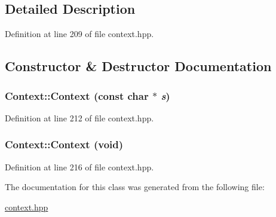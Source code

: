 \subsection{Detailed Description}


Definition at line 209 of file context.hpp.

\subsection{Constructor \& Destructor Documentation}
\hypertarget{class_context_a33e268526c03979a4db8bdabcce2fbf6}{
\subsubsection[{Context}]{\setlength{\rightskip}{0pt plus 5cm}Context::Context (const char $\ast$ {\em s})}}
\label{class_context_a33e268526c03979a4db8bdabcce2fbf6}


Definition at line 212 of file context.hpp.\hypertarget{class_context_a5dd483a8c3183056682ebaa945acdc6d}{
\subsubsection[{Context}]{\setlength{\rightskip}{0pt plus 5cm}Context::Context (void)}}
\label{class_context_a5dd483a8c3183056682ebaa945acdc6d}


Definition at line 216 of file context.hpp.

The documentation for this class was generated from the following file:\begin{DoxyCompactItemize}
\item 
\hyperlink{context_8hpp}{context.hpp}\end{DoxyCompactItemize}
